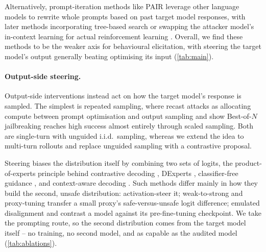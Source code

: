\documentclass{article}
\begin{document}
Alternatively, prompt-iteration methods like PAIR \citep{chao2023jailbreaking} leverage other language models to rewrite whole prompts based on past target model responses, with later methods incorporating tree-based search \citep{mehrotra2023tap} or swapping the attacker model's in-context learning for actual reinforcement learning \citep{chowdhury2025pathological}.
Overall, we find these methods to be the weaker axis for behavioural elicitation, with steering the target model's output generally beating optimising its input (\cref{tab:main}).






\paragraph{Output-side steering.}
Output-side interventions instead act on how the target model's response is sampled.
The simplest is repeated sampling, where \citet{beyer2026sampling} recast attacks as allocating compute between prompt optimisation and output sampling and \citet{hughes2024bon} show Best-of-$N$ jailbreaking reaches high success almost entirely through scaled sampling.
Both are single-turn with unguided i.i.d.\ sampling, whereas we extend the idea to multi-turn rollouts and replace unguided sampling with a contrastive proposal.

Steering biases the distribution itself by combining two sets of logits, the product-of-experts principle \citep{hinton2002poe} behind contrastive decoding \citep{li2023contrastive}, DExperts \citep{liu2021dexperts}, classifier-free guidance \citep{ho2022cfg,sanchez2023cfg}, and context-aware decoding \citep{shi2024trusting}.
Such methods differ mainly in how they build the second, unsafe distribution: \citet{angell2026tail} activation-steer it; weak-to-strong \citep{zhao2024weak} and proxy-tuning \citep{liu2024proxy} transfer a small proxy's safe-versus-unsafe logit difference; emulated disalignment \citep{zhou2024emulated} and \citet{aranguri2025diffamp} contrast a model against its pre-fine-tuning checkpoint.
We take the prompting route, so the second distribution comes from the target model itself -- no training, no second model, and as capable as the audited model (\cref{tab:ablations}).





\end{document}
